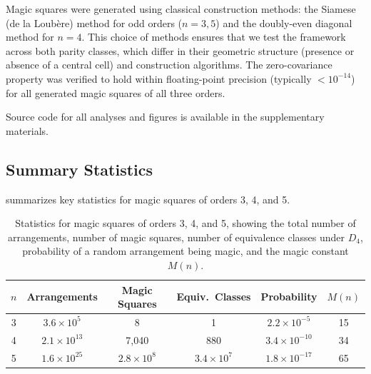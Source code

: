 Magic squares were generated using classical construction methods:
the Siamese (de la Loubère) method for odd orders ($n = 3, 5$)
and the doubly-even diagonal method for $n = 4$.
This choice of methods ensures that we test the framework across both parity classes,
which differ in their geometric structure (presence or absence of a central cell)
and construction algorithms.
The zero-covariance property was verified to hold within floating-point precision
(typically $< 10^{-14}$) for all generated magic squares of all three orders.

Source code for all analyses and figures is available in the supplementary materials.

\subsection{Summary Statistics}

 summarizes key statistics for magic squares of orders 3, 4, and 5.

\begin{table}[H]
\centering
\begin{tabular}{cccccc}
\toprule
$n$ & Arrangements & Magic Squares & Equiv.\ Classes & Probability & $M(n)$ \\
\midrule
3 & $3.6 \times 10^5$ & 8 & 1 & $2.2 \times 10^{-5}$ & 15 \\
4 & $2.1 \times 10^{13}$ & 7,040 & 880 & $3.4 \times 10^{-10}$ & 34 \\
5 & $1.6 \times 10^{25}$ & $2.8 \times 10^{8}$ & $3.4 \times 10^{7}$ & $1.8 \times 10^{-17}$ & 65 \\
\bottomrule
\end{tabular}
\caption{Statistics for magic squares of orders 3, 4, and 5,
showing the total number of arrangements, number of magic squares,
number of equivalence classes under $D_4$, probability of a random arrangement being magic,
and the magic constant $M(n)$.}
\label{tab:magic_stats}
\end{table}
